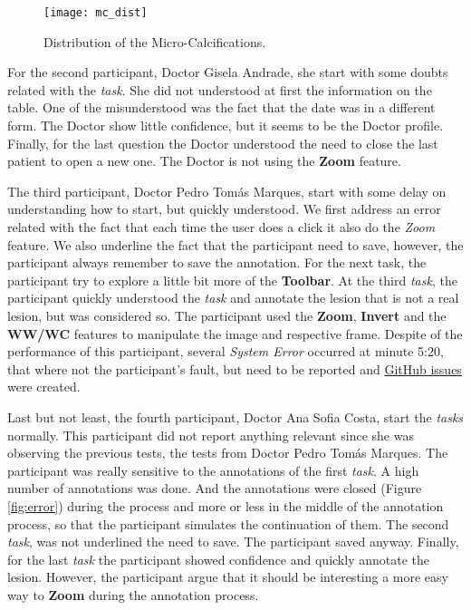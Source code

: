 
\hfill

\begin{figure}[h]
\centering
\texttt{[image: mc\_dist]}
\caption{Distribution of the Micro-Calcifications.}
\label{fig:mc_dist}
\end{figure}

\hfill


For the second participant, Doctor Gisela Andrade, she start with some doubts related with the \textit{task}. She did not understood at first the information on the table. One of the misunderstood was the fact that the date was in a different form. The Doctor show little confidence, but it seems to be the Doctor profile. Finally, for the last question the Doctor understood the need to close the last patient to open a new one. The Doctor is not using the \textbf{Zoom} feature.

\clearpage

The third participant, Doctor Pedro Tom\'{a}s Marques, start with some delay on understanding how to start, but quickly understood. We first address an error related with the fact that each time the user does a click it also do the \textit{Zoom} feature. We also underline the fact that the participant need to save, however, the participant always remember to save the annotation. For the next task, the participant try to explore a little bit more of the \textbf{Toolbar}. At the third \textit{task}, the participant quickly understood the \textit{task} and annotate the lesion that is not a real lesion, but was considered so. The participant used the \textbf{Zoom}, \textbf{Invert} and the \textbf{WW/WC} features to manipulate the image and respective frame. Despite of the performance of this participant, several \textit{System Error} occurred at minute 5:20, that where not the participant's fault, but need to be reported and \hyperlink{https://github.com/MIMBCD-UI/prototype-breast-screening/issues}{GitHub issues} were created.

Last but not least, the fourth participant, Doctor Ana Sofia Costa, start the \textit{tasks} normally. This participant did not report anything relevant since she was observing the previous tests, the tests from Doctor Pedro Tom\'{a}s Marques. The participant was really sensitive to the annotations of the first \textit{task}. A high number of annotations was done. And the annotations were closed (Figure \ref{fig:error}) during the process and more or less in the middle of the annotation process, so that the participant simulates the continuation of them. The second \textit{task}, was not underlined the need to save. The participant saved anyway. Finally, for the last \textit{task} the participant showed confidence and quickly annotate the lesion. However, the participant argue that it should be interesting a more easy way to \textbf{Zoom} during the annotation process.


